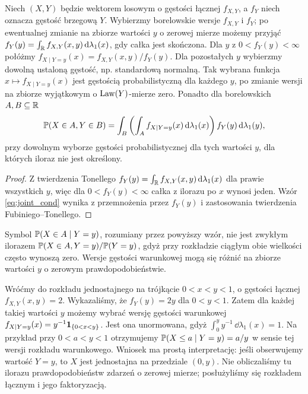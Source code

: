 \begin{stwierdzenie}
Niech $(X,Y)$ będzie wektorem losowym o gęstości łącznej $f_{X,Y}$,
a $f_Y$ niech oznacza gęstość brzegową $Y$.
Wybierzmy borelowskie wersje $f_{X,Y}$ i $f_Y$; po ewentualnej
zmianie na zbiorze wartości $y$ o zerowej mierze możemy przyjąć
$f_Y(y)=\int_{\mathbb{R}} f_{X,Y}(x,y)\,\mathrm{d}\lambda_1(x)$,
gdy całka jest skończona. Dla $y$ z $0<f_Y(y)<\infty$
połóżmy $f_{X\mid Y=y}(x)=f_{X,Y}(x,y)/f_Y(y)$.
Dla pozostałych $y$ wybierzmy dowolną ustaloną gęstość,
np. standardową normalną. Tak wybrana funkcja
$x\mapsto f_{X\mid Y=y}(x)$ jest gęstością
probabilistyczną dla każdego $y$, po zmianie wersji na zbiorze
wyjątkowym o $\operatorname{Law}(Y)$-mierze zero.
Ponadto dla borelowskich $A,B\subseteq\mathbb{R}$
\begin{equation}\label{eq:joint_cond}
\mathbb{P}(X\in A,Y\in B)
=\int_B\left(\int_A f_{X\mid Y=y}(x)\,\mathrm{d}\lambda_1(x)\right)
 f_Y(y)\,\mathrm{d}\lambda_1(y),
\end{equation}
przy dowolnym wyborze gęstości probabilistycznej dla tych wartości $y$,
dla których iloraz nie jest określony.
\end{stwierdzenie}
\begin{proof}
Z twierdzenia Tonellego $f_Y(y)=\int_{\mathbb{R}} f_{X,Y}(x,y)\,
\mathrm{d}\lambda_1(x)$ dla prawie wszystkich $y$, więc dla
$0<f_Y(y)<\infty$ całka z ilorazu po $x$ wynosi jeden.
Wzór \eqref{eq:joint_cond} wynika z przemnożenia przez $f_Y(y)$
i zastosowania twierdzenia Fubiniego--Tonellego.
\end{proof}

\begin{uwaga}
Symbol $\mathbb{P}(X\in A\mid Y=y)$, rozumiany przez powyższy wzór,
nie jest zwykłym ilorazem $\mathbb{P}(X\in A,Y=y)/\mathbb{P}(Y=y)$,
gdyż przy rozkładzie ciągłym obie wielkości często wynoszą zero.
Wersje gęstości warunkowej mogą się różnić na zbiorze wartości $y$
o zerowym prawdopodobieństwie.
\end{uwaga}

\begin{przyklad}
Wróćmy do rozkładu jednostajnego na trójkącie
$0<x<y<1$, o gęstości łącznej $f_{X,Y}(x,y)=2$.
Wykazaliśmy, że $f_Y(y)=2y$ dla $0<y<1$.
Zatem dla każdej takiej wartości $y$ możemy wybrać
wersję gęstości warunkowej
$f_{X\mid Y=y}(x)=y^{-1}\mathbf{1}_{\{0<x<y\}}$.
Jest ona unormowana, gdyż $\int_0^y y^{-1}\,\dd\lambda_1(x)=1$.
Na przykład przy $0<a<y<1$ otrzymujemy
$\mathbb{P}(X\leq a\mid Y=y)=a/y$ w sensie tej wersji
rozkładu warunkowego. Wniosek ma prostą interpretację:
jeśli obserwujemy wartość $Y=y$, to $X$ jest jednostajna
na przedziale $(0,y)$. Nie obliczaliśmy tu ilorazu
prawdopodobieństw zdarzeń o zerowej mierze;
posłużyliśmy się rozkładem łącznym i jego faktoryzacją.
\end{przyklad}



